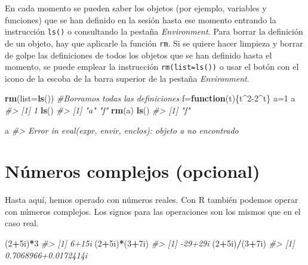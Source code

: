 \documentclass[
]{book}
\newenvironment{Shaded}{\begin{snugshade}}{\end{snugshade}}
\newcommand{\CommentTok}[1]{\textcolor[rgb]{0.56,0.35,0.01}{\textit{#1}}}
\newcommand{\ControlFlowTok}[1]{\textcolor[rgb]{0.13,0.29,0.53}{\textbf{#1}}}
\newcommand{\DataTypeTok}[1]{\textcolor[rgb]{0.13,0.29,0.53}{#1}}
\newcommand{\DecValTok}[1]{\textcolor[rgb]{0.00,0.00,0.81}{#1}}
\newcommand{\KeywordTok}[1]{\textcolor[rgb]{0.13,0.29,0.53}{\textbf{#1}}}
\newcommand{\NormalTok}[1]{#1}
\newcommand{\OperatorTok}[1]{\textcolor[rgb]{0.81,0.36,0.00}{\textbf{#1}}}
\theoremstyle{definition}
\theoremstyle{definition}
\theoremstyle{definition}
\theoremstyle{remark}
\begin{document}
En cada momento se pueden saber los objetos (por ejemplo, variables y funciones) que se han definido en la sesión hasta ese momento entrando
la instrucción \texttt{ls()} o consultando la pestaña \emph{Environment}.
Para borrar la definición de un objeto, hay que aplicarle la función \texttt{rm}.
Si se quiere hacer limpieza y borrar de golpe las definiciones de todos los objetos que se han definido hasta el momento,
se puede emplear la instrucción \texttt{rm(list=ls())} o usar el botón con el icono de la escoba de la barra superior de la pestaña \emph{Environment}.

\begin{Shaded}
\begin{Highlighting}[]
\KeywordTok{rm}\NormalTok{(}\DataTypeTok{list=}\KeywordTok{ls}\NormalTok{())    }\CommentTok{\#Borramos todas las definiciones}
\NormalTok{f=}\ControlFlowTok{function}\NormalTok{(t)\{t}\OperatorTok{\^{}}\DecValTok{2{-}2}\OperatorTok{\^{}}\NormalTok{t\}}
\NormalTok{a=}\DecValTok{1}
\NormalTok{a}
\CommentTok{\#\textgreater{} [1] 1}
\KeywordTok{ls}\NormalTok{()}
\CommentTok{\#\textgreater{} [1] "a" "f"}
\KeywordTok{rm}\NormalTok{(a)}
\KeywordTok{ls}\NormalTok{()}
\CommentTok{\#\textgreater{} [1] "f"}
\end{Highlighting}
\end{Shaded}

\begin{Shaded}
\begin{Highlighting}[]
\NormalTok{a}
\CommentTok{\#\textgreater{} Error in eval(expr, envir, enclos): objeto \textquotesingle{}a\textquotesingle{} no encontrado}
\end{Highlighting}
\end{Shaded}

\hypertarget{nuxfameros-complejos-opcional}{%
\section{Números complejos (opcional)}\label{nuxfameros-complejos-opcional}}

Hasta aquí, hemos operado con números reales. Con R también podemos operar con números complejos. Los signos para las operaciones son los mismos que en el caso real.

\begin{Shaded}
\begin{Highlighting}[]
\NormalTok{(}\DecValTok{2}\OperatorTok{+}\NormalTok{5i)}\OperatorTok{*}\DecValTok{3}
\CommentTok{\#\textgreater{} [1] 6+15i}
\NormalTok{(}\DecValTok{2}\OperatorTok{+}\NormalTok{5i)}\OperatorTok{*}\NormalTok{(}\DecValTok{3}\OperatorTok{+}\NormalTok{7i)}
\CommentTok{\#\textgreater{} [1] {-}29+29i}
\NormalTok{(}\DecValTok{2}\OperatorTok{+}\NormalTok{5i)}\OperatorTok{/}\NormalTok{(}\DecValTok{3}\OperatorTok{+}\NormalTok{7i)}
\CommentTok{\#\textgreater{} [1] 0.7068966+0.0172414i}
\end{Highlighting}
\end{Shaded}
\end{document}
